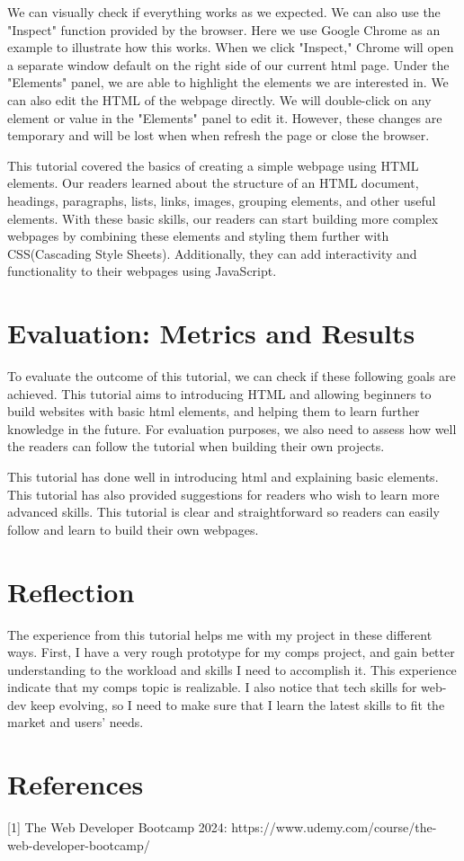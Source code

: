 \documentclass[10pt,twocolumn]{article}
\begin{document}
We can visually check if everything works as we expected. We can also use the "Inspect" function provided by the browser. Here we use Google Chrome as an example to illustrate how this works. When we click "Inspect," Chrome will open a separate window default on the right side of our current html page. Under the "Elements" panel, we are able to highlight the elements we are interested in. We can also edit the HTML of the webpage directly. We will double-click on any element or value in the "Elements" panel to edit it. However, these changes are temporary and will be lost when when refresh the page or close the browser.

This tutorial covered the basics of creating a simple webpage using HTML elements. Our readers learned about the structure of an HTML document, headings, paragraphs, lists, links, images, grouping elements, and other useful elements. With these basic skills, our readers can start building more complex webpages by combining these elements and styling them further with CSS(Cascading Style Sheets). Additionally, they can add interactivity and functionality to their webpages using JavaScript.


\section{Evaluation: Metrics and Results}

To evaluate the outcome of this tutorial, we can check if these following goals are achieved. This tutorial aims to introducing HTML and allowing beginners to build websites with basic html elements, and helping them to learn further knowledge in the future. For evaluation purposes, we also need to assess how well the readers can follow the tutorial when building their own projects.

This tutorial has done well in introducing html and explaining basic elements. This tutorial has also provided suggestions for readers who wish to learn more advanced skills. This tutorial is clear and straightforward so readers can easily follow and learn to build their own webpages.

\section{Reflection}

The experience from this tutorial helps me with my project in these different ways. First, I have a very rough prototype for my comps project, and gain better understanding to the workload and skills I need to accomplish it. This experience indicate that my comps topic is realizable. I also notice that tech skills for web-dev keep evolving, so I need to make sure that I learn the latest skills to fit the market and users' needs. 

\section{References}
[1] The Web Developer Bootcamp 2024: https://www.udemy.com/course/the-web-developer-bootcamp/
\end{document}

